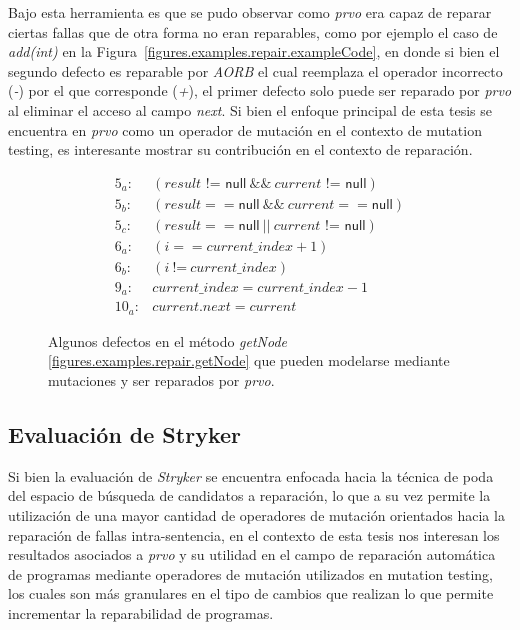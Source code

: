 Bajo esta herramienta es que se pudo observar como \emph{prvo} era capaz de reparar ciertas fallas que de otra forma no eran reparables, como por ejemplo el caso de \emph{add(int)} en la Figura~\ref{figures.examples.repair.exampleCode}, en donde si bien el segundo defecto es reparable por \emph{AORB} el cual reemplaza el operador incorrecto (\emph{-}) por el que corresponde (\emph{+}), el primer defecto solo puede ser reparado por \emph{prvo} al eliminar el acceso al campo \emph{next}. Si bien el enfoque principal de esta tesis se encuentra en \emph{prvo} como un operador de mutaci\'on en el contexto de mutation testing, es interesante mostrar su contribuci\'on en el contexto de reparaci\'on.

\begin{figure}[t]
	\footnotesize
	$$
	\begin{array}{rl}
	5_a: & (\mathit{result} \mbox{ != }\mathsf{null}\ \&\&\ \mathit{current}\mbox{ != }\mathsf{null})\\
	5_b: & (\mathit{result} == \mathsf{null}\ \&\&\ \mathit{current} == \mathsf{null})\\
	5_c: & (\mathit{result} == \mathsf{null}\ ||\ \mathit{current}\mbox{ != }\mathsf{null})\\
	6_a: & (\mathit{i} == \mathit{current\_index} + 1)\\
	6_b: & (\mathit{i}\ \mbox{!=}\ \mathit{current\_index})\\
	9_a: & \mathit{current\_index} = \mathit{current\_index} - 1\\
	10_a: & \mathit{current.next} = \mathit{current}
	\end{array}
	$$
	\normalsize
	\caption{Algunos defectos en el m\'etodo \emph{getNode} \ref{figures.examples.repair.getNode} que pueden modelarse mediante mutaciones y ser reparados por \emph{prvo}.}
	\label{figures.examples.repair.faultsGetNode}
\end{figure}

\subsection{Evaluaci\'on de Stryker}
\label{sec:repair.striker.evaluation}

Si bien la evaluaci\'on de \emph{Stryker} se encuentra enfocada hacia la t\'ecnica de poda del espacio de b\'usqueda de candidatos a reparaci\'on, lo que a su vez permite la utilizaci\'on de una mayor cantidad de operadores de mutaci\'on orientados hacia la reparaci\'on de fallas intra-sentencia, en el contexto de esta tesis nos interesan los resultados asociados a \emph{prvo} y su utilidad en el campo de reparaci\'on autom\'atica de programas mediante operadores de mutaci\'on utilizados en mutation testing, los cuales son m\'as granulares en el tipo de cambios que realizan lo que permite incrementar la reparabilidad de programas.


